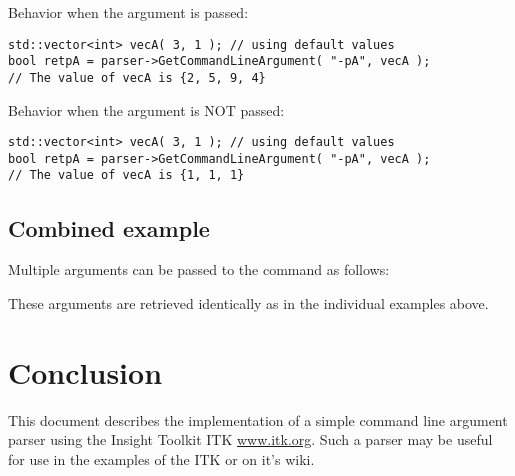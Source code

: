 \documentclass{InsightArticle}
\begin{document}
Behavior when the argument is passed:

\small{}\normalsize

\small
\begin{verbatim}
std::vector<int> vecA( 3, 1 ); // using default values
bool retpA = parser->GetCommandLineArgument( "-pA", vecA );
// The value of vecA is {2, 5, 9, 4}
\end{verbatim}
\normalsize

Behavior when the argument is NOT passed:

\small{}\normalsize

\small
\begin{verbatim}
std::vector<int> vecA( 3, 1 ); // using default values
bool retpA = parser->GetCommandLineArgument( "-pA", vecA );
// The value of vecA is {1, 1, 1}
\end{verbatim}
\normalsize

\subsection{Combined example}

Multiple arguments can be passed to the command as follows:

\small{}\normalsize

These arguments are retrieved identically as in the individual examples above.


\section{Conclusion}

This document describes the implementation of a simple command line
argument parser using the Insight Toolkit ITK \url{www.itk.org}.
Such a parser may be useful for use in the examples of the ITK or on
it's wiki.



%
%
\end{document}
